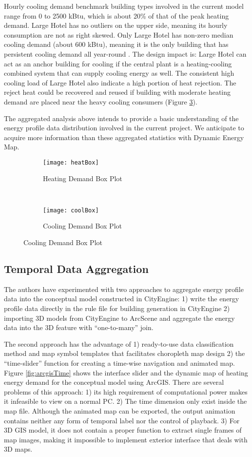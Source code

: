 \documentclass[hidelinks,12pt]{article}
\newcommand{\fref}[1]{Figure \ref{#1}}
\begin{document}
Hourly cooling demand benchmark building types involved in the current
model range from 0 to 2500 kBtu, which is about 20\% of that of the
peak heating demand. Large Hotel has no outliers on the upper side,
meaning its hourly consumption are not as right skewed. Only Large
Hotel has non-zero median cooling demand (about 600 kBtu), meaning it
is the only building that has persistent cooling demand all year-round
. The design impact is: Large Hotel can act as an anchor building for
cooling if the central plant is a heating-cooling combined system that
can supply cooling energy as well. The consistent high cooling load of
Large Hotel also indicate a high portion of heat rejection. The reject
heat could be recovered and reused if building with moderate heating
demand are placed near the heavy cooling consumers
(\fref{fig:coolBox}).

The aggregated analysis above intends to provide a basic understanding
of the energy profile data distribution involved in the current
project. We anticipate to acquire more information than these
aggregated statistics with Dynamic Energy Map.

\begin{figure}[h!]
  \centering
  \begin{subfigure}
  \centering
  \texttt{[image: heatBox]}
  \caption{Heating Demand Box Plot}
  \label{fig:heatBox}
  \end{subfigure}%
  ~
  \begin{subfigure}
  \centering
  \texttt{[image: coolBox]}
  \caption{Cooling Demand Box Plot}
  \label{fig:coolBox}
  \end{subfigure}
\end{figure}   

\subsection{Temporal Data Aggregation}
The authors have experimented with two approaches to aggregate energy
profile data into the conceptual model constructed in CityEngine: 1)
write the energy profile data directly in the rule file for building
generation in CityEngine 2) importing 3D models from CityEngine to
ArcScene and aggregate the energy data into the 3D feature with
``one-to-many'' join.

The second approach has the advantage of 1) ready-to-use data
classification method and map symbol templates that facilitates
choropleth map design 2) the ``time-slider'' function for creating a
time-wise navigation and animated map. \fref{fig:arcgisTime} shows the
interface slider and the dynamic map of heating energy demand for the
conceptual model using ArcGIS. There are several problems of this
approach: 1) its high requirement of computational power makes it
infeasible to view on a normal PC. 2) The time dimension only exist
inside the map file. Although the animated map can be exported, the
output animation contains neither any form of temporal label nor the
control of playback. 3) For 3D GIS model, it does not contain a proper
function to extract single frames of map images, making it impossible
to implement exterior interface that deals with 3D maps.
\end{document}
